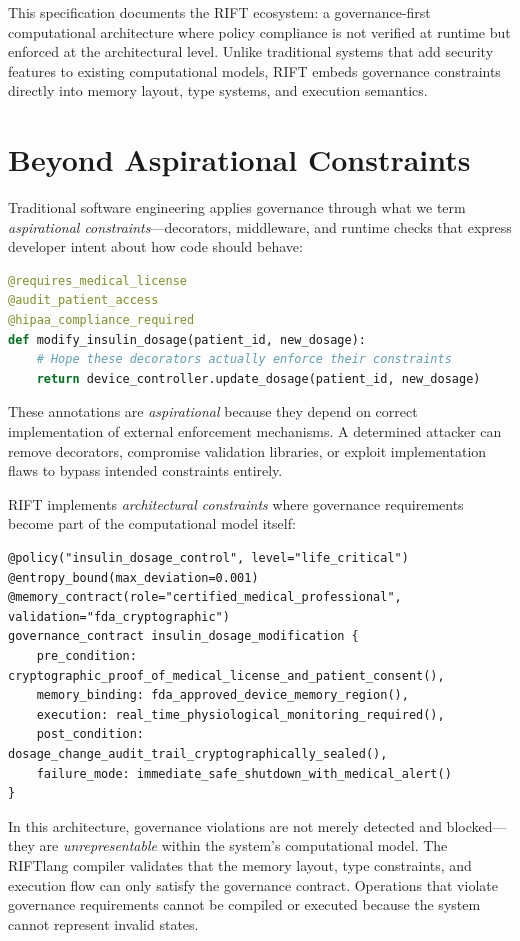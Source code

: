 This specification documents the RIFT ecosystem: a governance-first computational architecture where policy compliance is not verified at runtime but enforced at the architectural level. Unlike traditional systems that add security features to existing computational models, RIFT embeds governance constraints directly into memory layout, type systems, and execution semantics.

\section*{Beyond Aspirational Constraints}

Traditional software engineering applies governance through what we term \textit{aspirational constraints}—decorators, middleware, and runtime checks that express developer intent about how code should behave:

\begin{lstlisting}[language=Python]
@requires_medical_license
@audit_patient_access  
@hipaa_compliance_required
def modify_insulin_dosage(patient_id, new_dosage):
    # Hope these decorators actually enforce their constraints
    return device_controller.update_dosage(patient_id, new_dosage)
\end{lstlisting}

These annotations are \textit{aspirational} because they depend on correct implementation of external enforcement mechanisms. A determined attacker can remove decorators, compromise validation libraries, or exploit implementation flaws to bypass intended constraints entirely.

RIFT implements \textit{architectural constraints} where governance requirements become part of the computational model itself:

\begin{lstlisting}[language=rift]
@policy("insulin_dosage_control", level="life_critical")
@entropy_bound(max_deviation=0.001)
@memory_contract(role="certified_medical_professional", validation="fda_cryptographic")
governance_contract insulin_dosage_modification {
    pre_condition: cryptographic_proof_of_medical_license_and_patient_consent(),
    memory_binding: fda_approved_device_memory_region(),
    execution: real_time_physiological_monitoring_required(),
    post_condition: dosage_change_audit_trail_cryptographically_sealed(),
    failure_mode: immediate_safe_shutdown_with_medical_alert()
}
\end{lstlisting}

In this architecture, governance violations are not merely detected and blocked—they are \textit{unrepresentable} within the system's computational model. The RIFTlang compiler validates that the memory layout, type constraints, and execution flow can only satisfy the governance contract. Operations that violate governance requirements cannot be compiled or executed because the system cannot represent invalid states.

